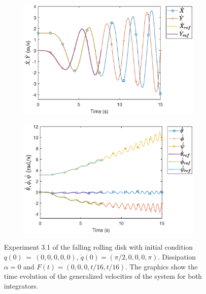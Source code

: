 \documentclass{aims}
\numberwithin{equation}{section}
\theoremstyle{definition}
\begin{document}
\begin{figure}
  \centering
  \begin{subfigure}[b]{0.75\textwidth}
    \centering
    \includegraphics[width=\textwidth]{fig/31XdotYdot.eps}
  \end{subfigure}
  \par\bigskip
  \begin{subfigure}[b]{0.75\textwidth}
    \centering
    \includegraphics[width=\textwidth]{fig/31thetadotphidotpsidot.eps}
  \end{subfigure}
  \caption{Experiment 3.1 of the falling rolling disk with initial condition $q(0)~=~(0,0,0,0,0)$, $\dot{q}(0) = (\pi/2,0,0,0,\pi)$. Dissipation $\alpha = 0$ and $F(t) = (0,0,0,t/16,t/16)$. The graphics show the time evolution of the generalized velocities of the system for both integrators.}
  \label{fig:disco_experimento_3_1_2}
\end{figure}
\end{document}
